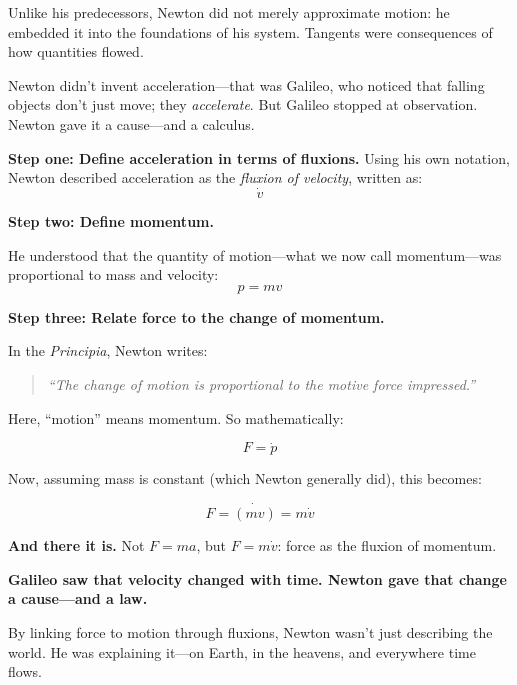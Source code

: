   

Unlike his predecessors, Newton did not merely approximate motion: he embedded it into the foundations of his system. Tangents were consequences of how quantities flowed.

  Newton didn’t invent acceleration—that was Galileo, who noticed that falling objects don’t just move; they \textit{accelerate}. But Galileo stopped at observation. Newton gave it a cause—and a calculus.
  
  \textbf{Step one: Define acceleration in terms of fluxions.}  
  Using his own notation, Newton described acceleration as the \textit{fluxion of velocity}, written as:
  \[
  \dot{v}
  \]
  
  \textbf{Step two: Define momentum.}  

  He understood that the quantity of motion—what we now call momentum—was proportional to mass and velocity:
  \[
  p = m v
  \]
  
  \textbf{Step three: Relate force to the change of momentum.}  

  In the \textit{Principia}, Newton writes:

  \begin{quote}
  \textit{“The change of motion is proportional to the motive force impressed.”}
  \end{quote}

  Here, “motion” means momentum. So mathematically:

  \[
  F = \dot{p}
  \]
  
  Now, assuming mass is constant (which Newton generally did), this becomes:

  \[
  F = \dot{(mv)} = m\dot{v}
  \]
  
  \textbf{And there it is.} Not \( F = ma \), but \( F = m\dot{v} \): force as the fluxion of momentum.
  
  \textbf{Galileo saw that velocity changed with time. Newton gave that change a cause—and a law.}
  
  By linking force to motion through fluxions, Newton wasn’t just describing the world. He was explaining it—on Earth, in the heavens, and everywhere time flows.


